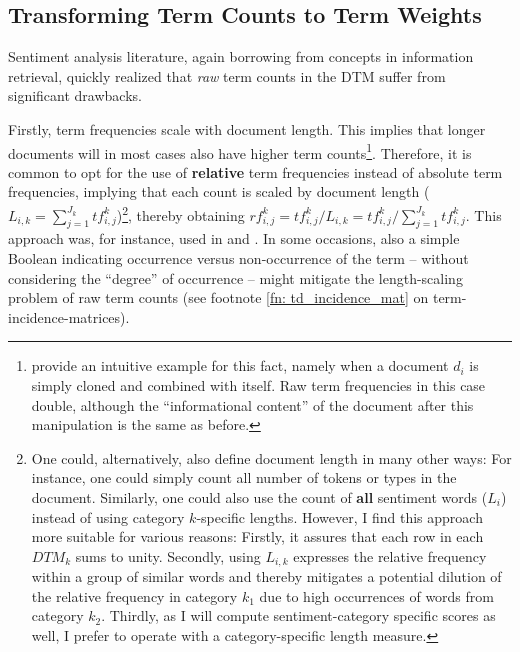 
\subsection{Transforming Term Counts to Term Weights}
\label{ssec: senti_termweighting}
Sentiment analysis literature, again borrowing from concepts in information retrieval, quickly realized that \textit{raw} term counts in the DTM suffer from significant drawbacks.

Firstly, term frequencies scale with document length. This implies that longer documents will in most cases also have higher term counts\footnote{\textcite[127]{ManningSchutze_IR_2008} provide an intuitive example for this fact, namely when a document $d_i$ is simply cloned and combined with itself. Raw term frequencies in this case double, although the \enquote{informational content} of the document after this manipulation is the same as before.}. Therefore, it is common to opt for the use of \textbf{relative} term frequencies instead of absolute term frequencies, implying that each count is scaled by document length ($L_{i,k} = \sum_{j=1}^{J_{k}} tf_{i,j}^k$)\footnote{One could, alternatively, also define document length in many other ways: For instance, one could simply count all number of tokens or types in the document. Similarly, one could also use the count of \textbf{all} sentiment words ($L_{i}$) instead of using category $k$-specific lengths. However, I find this approach more suitable for various reasons: Firstly, it assures that each row in each $DTM_k$ sums to unity. Secondly, using $L_{i,k}$ expresses the relative frequency within a group of similar words and thereby mitigates a potential dilution of the relative frequency in category $k_1$ due to high occurrences of words from category $k_2$. Thirdly, as I will compute sentiment-category specific scores as well, I prefer to operate with a category-specific length measure.}, thereby obtaining $rf_{i,j}^k = tf_{i,j}^k / L_{i,k} = tf_{i,j}^k / \sum_{j=1}^{J_{k}} tf_{i,j}^k$. This approach was, for instance, used in \textcite{TsaiWang2014} and \textcite{TsaiWang2016}. In some occasions, also a simple Boolean indicating occurrence versus non-occurrence of the term -- without considering the \enquote{degree} of occurrence -- might mitigate the length-scaling problem of raw term counts (see footnote \ref{fn: td_incidence_mat} on term-incidence-matrices).

